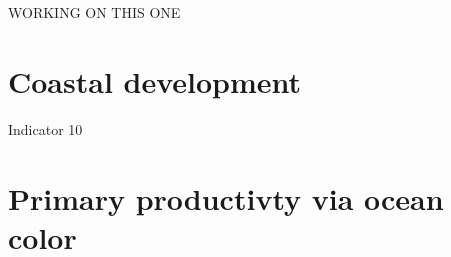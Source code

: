 \documentclass[
  letterpaper,
  oneside,
  open=any]{scrbook}
\begin{document}
WORKING ON THIS ONE

\section{Coastal development}\label{coastal-development}

Indicator 10

\begin{figure}


\caption{\label{fig-landuse}}

\end{figure}%

\section{Primary productivty via ocean
color}\label{primary-productivty-via-ocean-color}
\end{document}

